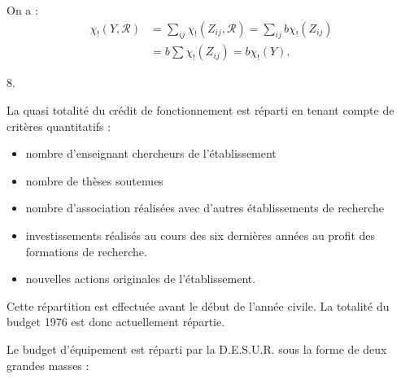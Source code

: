 On a :
\[
\begin{aligned}
\chi_!(Y,\mathcal{R})&=\sum_{ij}\chi_!(Z_{ij},\mathcal{R})=\sum_{ij}b\chi_!(Z_{ij})\\
&=b\sum\chi_!(Z_{ij})=b\chi_!(Y).
\end{aligned}
\]
\margin{(\unsure{ct.} sur $Z_{ij}$\unsure{)|]}}


8.


La quasi totalité du crédit de fonctionnement est réparti en tenant compte de critères quantitatifs :
\begin{itemize}
\item[-] nombre d'enseignant chercheurs de l'établissement
\item[-] nombre de thèses soutenues
\item[-] nombre d'association réalisées avec d'autres établissements de recherche
\item[-] investissements réalisés au cours des six dernières années au profit des formations de recherche.
\item[-] nouvelles actions originales de l'établissement.
\end{itemize}

Cette répartition est effectuée avant le début de l'année civile. La totalité du budget 1976 est donc actuellement répartie.

Le budget d'équipement est réparti par la D.E.S.U.R. sous la forme de deux grandes masses :


